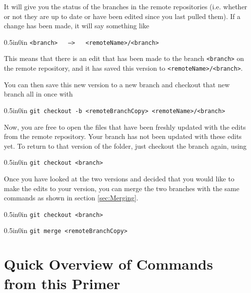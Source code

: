 \documentclass[11pt]{article}
\newcommand{\code}[1]{\begin{adjustwidth}{0.5in}{0in}
    \texttt{#1}
    \end{adjustwidth}}
\begin{document}
It will give you the status of the branches in the remote repositories (i.e. whether or not they are up to date or have been edited since you last pulled them).  If a change has been made, it will say something like

\code{<branch> \ \ --> \ \ <remoteName>/<branch>}

This means that there is an edit that has been made to the branch \texttt{<branch>} on the remote repository, and it has saved this version to \texttt{<remoteName>/<branch>}.

You can then save this new version to a new branch and checkout that new branch all in once with

\code{git checkout -b <remoteBranchCopy> <remoteName>/<branch>}

Now, you are free to open the files that have been freshly updated with the edits from the remote repository.  Your branch has not been updated with these edits yet.  To return to that version of the folder, just checkout the branch again, using
\code{git checkout <branch>}

Once you have looked at the two versions and decided that you would like to make the edits to your version, you can merge the two branches with the same commands as shown in section \ref{sec:Merging}.  

\code{git checkout <branch>}
\code{git merge <remoteBranchCopy>}




\newpage
{}
\thispagestyle{empty} %

\section{Quick Overview of Commands from this Primer}
\end{document}
